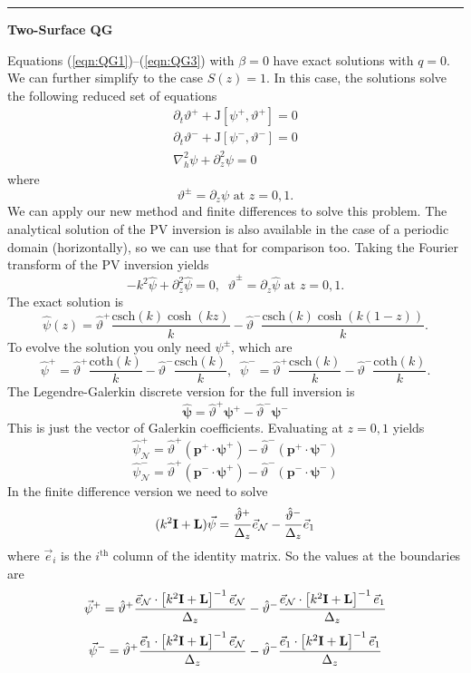 \documentclass[10pt]{article}
\newcommand{\pd}[1]{\partial_{#1}}
\newcommand{\tJ}{\text{J}}
\newcommand{\sN}{\mathcal{N}}
\newcommand{\mat}[1]{\text{\bf #1}}
\begin{document}
\hrule
\begin{center}{\bf Two-Surface QG}\end{center}
Equations (\ref{eqn:QG1})--(\ref{eqn:QG3}) with $\beta=0$ have exact solutions with $q=0$.
We can further simplify to the case $S(z) = 1$.
In this case, the solutions solve the following reduced set of equations
\begin{gather}
\pd{t}\vartheta^+ + \tJ[\psi^+,\vartheta^+] = 0\\
\pd{t}\vartheta^-+ \tJ[\psi^-,\vartheta^-] = 0\\
\nabla_h^2\psi + \pd{z}^2\psi = 0
\end{gather}
where 
\begin{equation}
\vartheta^\pm= \pd{z}\psi\text{ at }z=0,1.
\end{equation}
We can apply our new method and finite differences to solve this problem.
The analytical solution of the PV inversion is also available in the case of a periodic domain (horizontally), so we can use that for comparison too.
Taking the Fourier transform of the PV inversion yields
\[-k^2\hat{\psi}+\pd{z}^2\hat{\psi} = 0,\;\;\hat{\vartheta}^\pm = \pd{z}\hat{\psi}\text{ at }z=0,1.\]
The exact solution is
\[\hat{\psi}(z) = \hat{\vartheta}^+\frac{\text{csch}(k)\cosh(kz)}{k}-\hat{\vartheta}^-\frac{\text{csch}(k)\cosh(k(1-z))}{k}.\]
To evolve the solution you only need $\psi^\pm$, which are
\[\hat{\psi}^+ = \hat{\vartheta}^+\frac{\text{coth}(k)}{k}-\hat{\vartheta}^-\frac{\text{csch}(k)}{k},\;\;\hat{\psi}^- = \hat{\vartheta}^+\frac{\text{csch}(k)}{k}-\hat{\vartheta}^-\frac{\text{coth}(k)}{k}.\]
The Legendre-Galerkin discrete version for the full inversion is
\[\hat{\bm{\psi}} = \hat{\vartheta}^+\bm{\psi}^+-\hat{\vartheta}^-\bm{\psi}^-\]
This is just the vector of Galerkin coefficients.
Evaluating at $z=0,1$ yields
\[\hat{\psi}_\sN^+ = \hat{\vartheta}^+(\bm{p}^+\cdot\bm{\psi}^+) - \hat{\vartheta}^-(\bm{p}^+\cdot\bm{\psi}^-)\]
\[\hat{\psi}_\sN^- = \hat{\vartheta}^+(\bm{p}^-\cdot\bm{\psi}^+) - \hat{\vartheta}^-(\bm{p}^-\cdot\bm{\psi}^-)\]
In the finite difference version we need to solve
\[(k^2\mat{I}+\mat{L})\vec{\psi} = \frac{\hat{\vartheta}^+}{\Delta_z}\vec{e}_\sN - \frac{\hat{\vartheta}^-}{\Delta_z}\vec{e}_1\]
where $\vec{e}_i$ is the $i^\text{th}$ column of the identity matrix.
So the values at the boundaries are
\[\vec{\psi}^+ = \hat{\vartheta}^+\frac{\vec{e}_\sN\cdot\left[k^2\mat{I}+\mat{L}\right]^{-1}\vec{e}_{\sN}}{\Delta_z} - \hat{\vartheta}^-\frac{\vec{e}_\sN\cdot\left[k^2\mat{I}+\mat{L}\right]^{-1}\vec{e}_{1}}{\Delta_z}\]
\[\vec{\psi}^- = \hat{\vartheta}^+\frac{\vec{e}_1\cdot\left[k^2\mat{I}+\mat{L}\right]^{-1}\vec{e}_{\sN}}{\Delta_z} - \hat{\vartheta}^-\frac{\vec{e}_1\cdot\left[k^2\mat{I}+\mat{L}\right]^{-1}\vec{e}_{1}}{\Delta_z}\]
\end{document}
